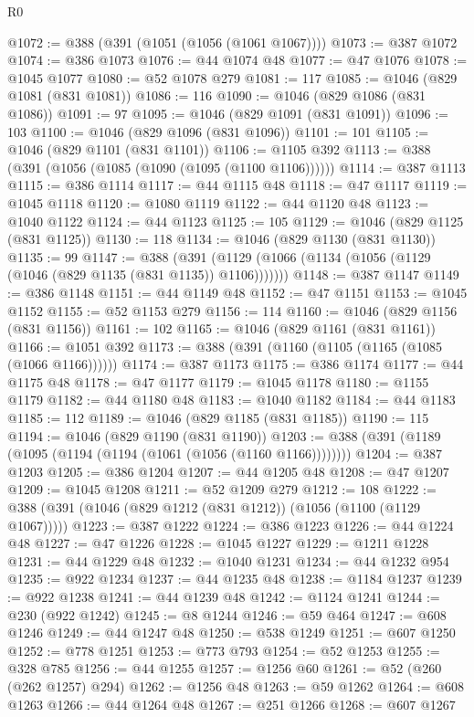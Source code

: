 \begin{lexlean}{R0}
\begin{coremodule}
{{{{{{{{{{{{{{{{{{{{{{{{{{{{{{{{{{{{{{{{{{{{{{{{{{{{{{{{{{{{{{{{{{{{{{{{{@1072 := @388 (@391 (@1051 (@1056 (@1061 @1067))))
@1073 := @387 @1072
@1074 := @386 @1073
@1076 := @44 @1074 @48
@1077 := @47 @1076
@1078 := @1045 @1077
@1080 := @52 @1078 @279
@1081 := 117
@1085 := @1046 (@829 @1081 (@831 @1081))
@1086 := 116
@1090 := @1046 (@829 @1086 (@831 @1086))
@1091 := 97
@1095 := @1046 (@829 @1091 (@831 @1091))
@1096 := 103
@1100 := @1046 (@829 @1096 (@831 @1096))
@1101 := 101
@1105 := @1046 (@829 @1101 (@831 @1101))
@1106 := @1105 @392
@1113 := @388 (@391 (@1056 (@1085 (@1090 (@1095 (@1100 @1106))))))
@1114 := @387 @1113
@1115 := @386 @1114
@1117 := @44 @1115 @48
@1118 := @47 @1117
@1119 := @1045 @1118
@1120 := @1080 @1119
@1122 := @44 @1120 @48
@1123 := @1040 @1122
@1124 := @44 @1123
@1125 := 105
@1129 := @1046 (@829 @1125 (@831 @1125))
@1130 := 118
@1134 := @1046 (@829 @1130 (@831 @1130))
@1135 := 99
@1147 := @388 (@391 (@1129 (@1066 (@1134 (@1056 (@1129 (@1046 (@829 @1135 (@831 @1135)) @1106)))))))
@1148 := @387 @1147
@1149 := @386 @1148
@1151 := @44 @1149 @48
@1152 := @47 @1151
@1153 := @1045 @1152
@1155 := @52 @1153 @279
@1156 := 114
@1160 := @1046 (@829 @1156 (@831 @1156))
@1161 := 102
@1165 := @1046 (@829 @1161 (@831 @1161))
@1166 := @1051 @392
@1173 := @388 (@391 (@1160 (@1105 (@1165 (@1085 (@1066 @1166))))))
@1174 := @387 @1173
@1175 := @386 @1174
@1177 := @44 @1175 @48
@1178 := @47 @1177
@1179 := @1045 @1178
@1180 := @1155 @1179
@1182 := @44 @1180 @48
@1183 := @1040 @1182
@1184 := @44 @1183
@1185 := 112
@1189 := @1046 (@829 @1185 (@831 @1185))
@1190 := 115
@1194 := @1046 (@829 @1190 (@831 @1190))
@1203 := @388 (@391 (@1189 (@1095 (@1194 (@1194 (@1061 (@1056 (@1160 @1166))))))))
@1204 := @387 @1203
@1205 := @386 @1204
@1207 := @44 @1205 @48
@1208 := @47 @1207
@1209 := @1045 @1208
@1211 := @52 @1209 @279
@1212 := 108
@1222 := @388 (@391 (@1046 (@829 @1212 (@831 @1212)) (@1056 (@1100 (@1129 @1067)))))
@1223 := @387 @1222
@1224 := @386 @1223
@1226 := @44 @1224 @48
@1227 := @47 @1226
@1228 := @1045 @1227
@1229 := @1211 @1228
@1231 := @44 @1229 @48
@1232 := @1040 @1231
@1234 := @44 @1232 @954
@1235 := @922 @1234
@1237 := @44 @1235 @48
@1238 := @1184 @1237
@1239 := @922 @1238
@1241 := @44 @1239 @48
@1242 := @1124 @1241
@1244 := @230 (@922 @1242)
@1245 := @8 @1244
@1246 := @59 @464
@1247 := @608 @1246
@1249 := @44 @1247 @48
@1250 := @538 @1249
@1251 := @607 @1250
@1252 := @778 @1251
@1253 := @773 @793
@1254 := @52 @1253
@1255 := @328 @785
@1256 := @44 @1255
@1257 := @1256 @60
@1261 := @52 (@260 (@262 @1257) @294)
@1262 := @1256 @48
@1263 := @59 @1262
@1264 := @608 @1263
@1266 := @44 @1264 @48
@1267 := @251 @1266
@1268 := @607 @1267
}}}}}}}}}}}}}}}}}}}}}}}}}}}}}}}}}}}}}}}}}}}}}}}}}}}}}}}}}}}}}}}}}}}}}}}}}
\end{coremodule}
\end{lexlean}
